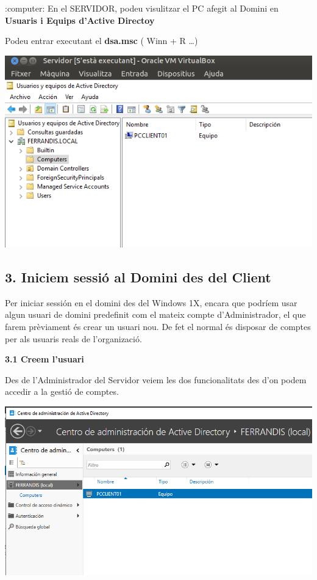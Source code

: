 \documentclass[
  a4paper,
]{article}
\begin{document}
:computer: En el SERVIDOR, podeu visulitzar el PC afegit al Domini en
\textbf{Usuaris i Equips d'Active Directoy}

Podeu entrar executant el \textbf{dsa.msc} ( Winn + R \ldots)

\includegraphics{png/20.png}

\subsection{3. Iniciem sessió al Domini des del
Client}\label{iniciem-sessiuxf3-al-domini-des-del-client}

Per iniciar sessión en el domini des del Windows 1X, encara que podríem
usar algun usuari de domini predefinit com el mateix compte
d'Administrador, el que farem prèviament és crear un usuari nou. De fet
el normal és disposar de comptes per als usuaris reals de l'organizació.

\textbf{3.1 Creem l'usuari}

Des de l'Administrador del Servidor veiem les dos funcionalitats des
d'on podem accedir a la gestió de comptes.

\includegraphics{png/centroadministracionactivedirectory.png}
\end{document}
